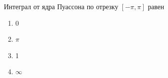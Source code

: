 Интеграл от ядра Пуассона по отрезку \([-\pi , \pi ]\) равен

\begin{enumerate}[label=\arabic*)]
    \item 0
    \item \(\pi\)
    \item 1
    \item \(\infty\)
\end{enumerate}

